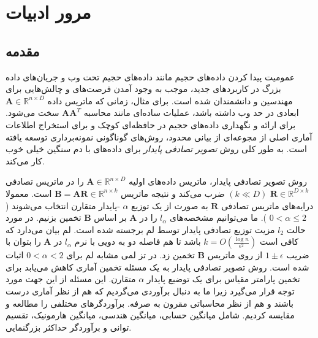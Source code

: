 \chapter{مرور ادبیات}
\section{مقدمه}
عمومیت پیدا کردن داده‌های حجیم مانند داده‌های حجیم تحت وب و جریان‌های داده بزرگ در کاربردهای جدید،
موجب به وجود آمدن فرصت‌های و چالش‌هایی برای مهندسین و دانشمندان شده است.
\cite{li2007stable}
برای مثال، زمانی که ماتریس داده 
$\mathbf{A} \in \mathbb{R}^{n \times D}$
ابعادی در حد وب داشته باشد، عملیات ساده‌ای مانند محاسبه
$\mathbf{A} \mathbf{A}^T$
سخت می‌شود.
برای ارائه و نگهداری داده‌های حجیم در حافظه‌ای کوچک و برای استخراج اطلاعات آماری اصلی از مجوعه‌ای از بیانی محدود، روش‌های گوناگونی نمونه‌برداری توسعه‌ یافته است. به طور کلی روش 
\textit{تصویر تصادفی پایدار}
 برای داده‌های با دم سنگین خیلی خوب کار می‌کند.

روش تصویر تصادفی پایدار، ماتریس داده‌های اولیه 
$\mathbf{A} \in \mathbb{R}^{n \times D}$
را در ماتریس تصادفی 
$\mathbf{R} \in \mathbb{R}^{D \times k}$
$(k \ll D)$
 ضرب می‌کند و نتیجه ماتریس
$\mathbf{B} = \mathbf{AR} \in \mathbb{R}^{n \times k}$
است. 
معمولا درایه‌های ماتریس تصادفی
$\mathbf{R}$
به صورت 
از یک توزیع 
$\alpha$
-پایدار متقارن انتخاب می‌شوند (
$ 0 < \alpha \leq 2$
).
ما می‌توانیم مشخصه‌های 
$l_\alpha$
را در 
$\mathbf{A}$
بر اساس 
$\mathbf{B}$
تخمین بزنیم. در مورد حالت 
$l_2$
مزیت توزیع تصادفی پایدار توسط لم 
برجسته شده است. لم 
بیان می‌دارد که کافی است 
$k=O(\frac{ \log  n}{\epsilon^ 2})$
باشد تا هم فاصله دو به دویی با نرم 
$l_\alpha$
در 
$\mathbf{A}$
را بتوان با ضریب 
$1 \pm \epsilon$
از روی ماتریس 
$\mathbf{B}$
تخمین زد. در تز 
\cite{li2007stable}
لمی مشابه لم 
برای 
$0 < \alpha < 2$
اثبات شده است. روش تصویر تصادفی پایدار به یک مسئله تخمین آماری کاهش می‌یابد برای تخمین پارامتر مقیاس برای یک توضیع پایدار $\alpha$ متقارن. این مسئله از این جهت مورد توجه قرار می‌گیرد زیرا ما به دنبال برآوردی می‌گردیم که هم از نظر آماری درست باشند و هم از نظر محاسباتی مقرون به صرفه. برآوردگرهای مختلفی را مطالعه و مقایسه کردیم. شامل میانگین حسابی، میانگین هندسی، میانگین هارمونیک، تقسیم توانی
و برآوردگر حداکثر بزرگنمایی.

